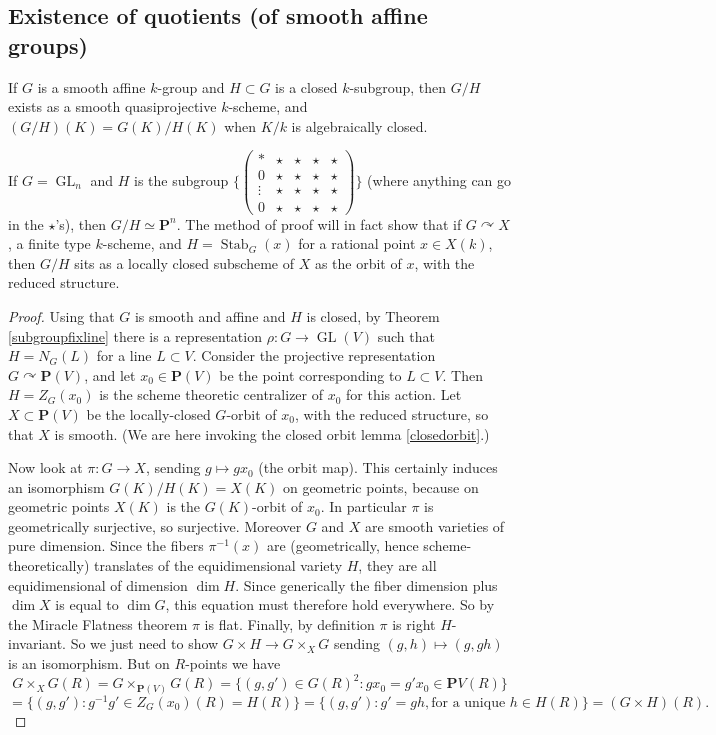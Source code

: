 \documentclass[10pt]{article}
\newcommand{\PP}{\mathbf{P}}
\newcommand{\GL}{\operatorname{GL}}
\renewcommand{\(}{\left(}
\renewcommand{\)}{\right)}
\newcommand{\actson}{\curvearrowright}
\newcommand{\Stab}{\operatorname{Stab}}
\newcommand{\dtimes}{\displaystyle\mathop{\times}}
\numberwithin{thm}{subsection}
\begin{document}
\subsection{Existence of quotients (of smooth affine groups)}
\begin{thm}\label{quotientsexist}
If $G$ is a smooth affine $k$-group and $H\subset G$ is a closed
$k$-subgroup, then $G/H$ exists as a smooth quasiprojective $k$-scheme,
and $(G/H)(K)=G(K)/H(K)$ when $K/k$ is algebraically closed.
\end{thm}
\begin{ex}
If $G=\GL_n$ and $H$ is the subgroup $\{\(\begin{smallmatrix}*&\star&\star&\star&\star\\
0&\star&\star&\star&\star\\
\vdots&\star&\star&\star&\star\\
0&\star&\star&\star&\star\end{smallmatrix}\)\}$ (where anything can go in the $\star$'s),
then $G/H\simeq\PP^n$.
The method of proof will in fact show that if $G\actson X$, a finite type $k$-scheme,
and $H=\Stab_G(x)$ for a rational point $x\in X(k)$,
then $G/H$ sits as a locally closed subscheme of $X$
as the orbit of $x$, with the reduced structure.
\end{ex}
\begin{proof}
Using that $G$ is smooth and affine
and $H$ is closed, by Theorem \ref{subgroupfixline}
there is a representation $\rho:G\to \GL(V)$
such that $H=N_G(L)$ for a line $L\subset V$.
Consider the projective representation $G\actson \PP(V)$,
and let $x_0\in \PP(V)$ be the point corresponding to $L\subset V$.
Then $H=Z_G(x_0)$ is the scheme theoretic centralizer
of $x_0$ for this action.
Let $X\subset\PP(V)$ be the locally-closed $G$-orbit of $x_0$,
with the reduced structure, so that $X$ is smooth. (We are here invoking
the closed orbit lemma \ref{closedorbit}.)

Now look at $\pi:G\to X$,
sending $g\mapsto gx_0$ (the orbit map).
This certainly induces an isomorphism $G(K)/H(K)=X(K)$ on geometric points,
because on geometric points $X(K)$ is the $G(K)$-orbit of $x_0$.
In particular $\pi$ is geometrically surjective, so surjective.
Moreover $G$ and $X$ are smooth varieties of pure dimension.
Since the fibers $\pi^{-1}(x)$ are (geometrically, hence scheme-theoretically)
translates of the equidimensional variety $H$,
they are all equidimensional of dimension $\dim H$.
Since generically the fiber dimension plus $\dim X$
is equal to $\dim G$, this equation must therefore hold everywhere.
So by the Miracle Flatness theorem \cite[23.1]{crt}
$\pi$ is flat.
Finally, by definition $\pi$ is right $H$-invariant.
So we just need to show $G\times H\to G\dtimes_X G$
sending $(g,h)\mapsto (g,gh)$ is an isomorphism.
But on $R$-points we have
\[G\dtimes_X G(R)=G\dtimes_{\PP(V)}G(R)
=\{(g,g')\in G(R)^2:gx_0=g'x_0\in \PP V(R)\}\]
\[=\{(g,g'):g^{-1}g'\in Z_G(x_0)(R)=H(R)\}
=\{(g,g'):g'=gh, \text{for a unique }h\in H(R)\}
=(G\times H)(R).\]
\end{proof}
\end{document}
